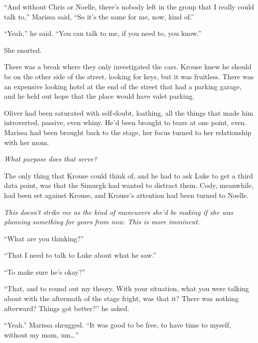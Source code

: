 ``And without Chris or Noelle, there's nobody left in the group that I really could talk to,'' Marissa said, ``So it's the same for me, now, kind of.''



``Yeah,'' he said.  ``You can talk to me, if you need to, you know.''



She snorted.



There was a break where they only investigated the cars.  Krouse knew he should be on the other side of the street, looking for keys, but it was fruitless.  There was an expensive looking hotel at the end of the street that had a parking garage, and he held out hope that the place would have valet parking.



Oliver had been saturated with self-doubt, loathing, all the things that made him introverted, passive, even whiny.  He'd been brought to tears at one point, even.  Marissa had been brought back to the stage, her focus turned to her relationship with her mom.



\emph{What purpose does that serve?}



The only thing that Krouse could think of, and he had to ask Luke to get a third data point, was that the Simurgh had wanted to distract them.  Cody, meanwhile, had been set against Krouse, and Krouse's attention had been turned to Noelle.



\emph{This doesn't strike me as the kind of maneuvers she'd be making if she was planning something for years from now}.  \emph{This is more imminent.}



``What are you thinking?''



``That I need to talk to Luke about what he saw.''



``To make sure he's okay?''



``That, and to round out my theory.  With your situation, what you were talking about with the aftermath of the stage fright, was that it?  There was nothing afterward?  Things got better?'' he asked.



``Yeah.'' Marissa shrugged.  ``It was good to be free, to have time to myself, without my mom, um\ldots''



